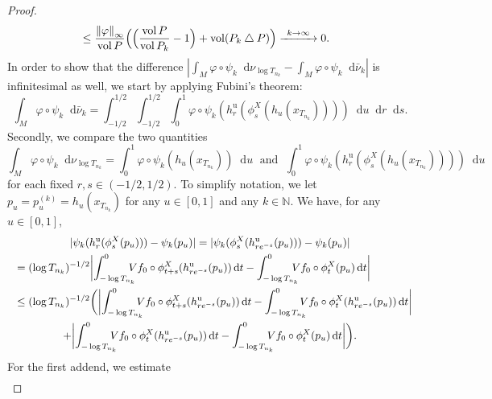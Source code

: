 \documentclass[JEP,XML,SOM,NoEqCountersInSection,Unicode,published]{cedram}
\newcommand\To[1]{\mathchoice{\xrightarrow{\kern4pt#1\kern3pt}}{\stackrel{#1}{\longrightarrow}}{}{}}
\newcommand \N{\mathbb{N}}
\newcommand*{\diff}{\mathop{}\!\mathrm{d}}
\newcommand{\norm}[1]{\left\lVert#1\right\rVert}
\DeclareMathOperator{\vol}{vol}
\theoremstyle{definition}
\begin{document}
\begin{appendix}
\begin{proof}
\begin{align*}
&\leq \frac{\norm{\varphi}_{\infty}}{\vol{P}}\Bigl(\Bigl(\frac{\vol{P}}{\vol{P_k}}-1\Bigr)+\vol(P_k\bigtriangleup P)\Bigr)\To{k\to\infty} 0.
\end{align*}
In order to show that the difference $|\int_{M}\varphi\circ \psi_k\diff\nu_{\log{T_{n_k}}}-\int_{M}\varphi\circ \psi_k\diff\bar{\nu}_k |$ is infinitesimal as well, we start by applying Fubini's theorem:
\begin{equation}
\label{Fubini}
\int_{M}\varphi\circ \psi_k\diff\bar{\nu}_k=\int_{-1/2}^{1/2}\int_{-1/2}^{1/2}\int_{0}^{1}\varphi\circ\psi_k(h^{\mathrm{u}}_r(\phi^{X}_{s}(h_u(x_{T_{n_k}}))))\diff u\diff r\diff s.
\end{equation}
Secondly, we compare the two quantities
\begin{equation*}
\int_{M}\varphi\circ \psi_k\diff\nu_{\log{T_{n_k}}}=\int_{0}^{1}\varphi\circ\psi_k(h_{u}(x_{T_{n_k}}))\diff u\; \text{ and }\;\int_{0}^{1}\varphi\circ\psi_k(h^{\mathrm{u}}_r(\phi^{X}_{s}(h_u(x_{T_{n_k}}))))\diff u
\end{equation*}
for each fixed $r,s\in (-1/2,1/2)$. To simplify notation, we let $p_u=p_u^{(k)}=h_u(x_{T_{n_k}})$ for any $u\in [0,1]$ and any $k\in \N$. We have, for any $u\in [0,1]$,
\begin{multline*}
|\psi_k(h^{\mathrm{u}}_r(\phi^{X}_s(p_u)))-\psi_k(p_u)|=|\psi_k(\phi^{X}_s(h^{\mathrm{u}}_{re^{-s}}(p_u)))-\psi_k(p_u)|\\
\shoveleft{=(\log{T_{n_k}})^{-1/2}\biggl|\int_{-\log{T_{n_k}}}^{0}\hspace*{-3mm}Vf_0\circ \phi^{X}_{t+s}(h^{\mathrm{u}}_{re^{-s}}(p_u))\diff t-\int_{-\log{T_{n_k}}}^{0}\hspace*{-3mm}Vf_0\circ \phi_t^{X}(p_u)\diff t\biggr|}\\
\shoveleft{\leq (\log{T_{n_k}})^{-1/2}\bigg(\biggl|\int_{-\log{T_{n_k}}}^{0}\hspace*{-3mm}Vf_0\circ \phi^{X}_{t+s}(h^{\mathrm{u}}_{re^{-s}}(p_u))\diff t
-\int_{-\log{T_{n_k}}}^{0}\hspace*{-3mm}Vf_0\circ \phi^{X}_{t}(h^{\mathrm{u}}_{re^{-s}}(p_u))\diff t\biggr|}\\
+\biggl|\int_{-\log{T_{n_k}}}^{0}\hspace*{-3mm}Vf_0\circ \phi^{X}_{t}(h^{\mathrm{u}}_{re^{-s}}(p_u))\diff t-\int_{-\log{T_{n_k}}}^{0}\hspace*{-3mm}Vf_0\circ \phi_t^{X}(p_u)\diff t\biggr|\bigg).
\end{multline*}
For the first addend, we estimate
\begin{align*}

\end{align*}
\end{proof}
\end{appendix}
\end{document}
